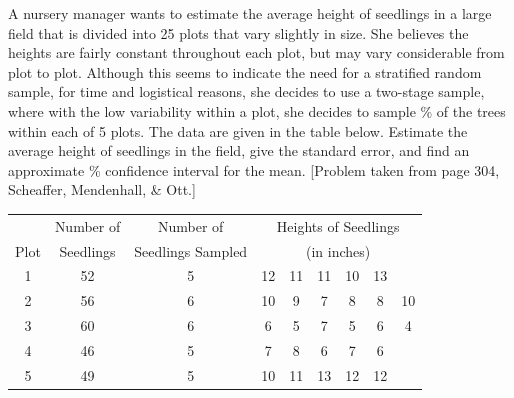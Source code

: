 \documentclass[usenames,dvipsnames]{homework}
\begin{document}
\begin{longproblem}
A nursery manager wants to estimate the average height of seedlings in a large field that is divided into 25 plots that vary slightly in size.  She believes the heights are fairly constant throughout each plot, but may vary considerable from plot to plot.  Although this seems to indicate the need for a stratified random sample, for time and logistical reasons, she decides to use a two-stage sample, where with the low variability within a plot, she decides to sample \unit[10]{\%} of the trees within each of 5 plots.  The data are given in the table below.  Estimate the average height of seedlings in the field, give the standard error, and find an approximate \unit[95]{\%} confidence interval for the mean.  [Problem taken from page 304, Scheaffer, Mendenhall, \& Ott.]

  \begin{center}
  \renewcommand{\arraystretch}{1.3}
  \begin{tabular}{c c c c c c c c c}
  \hline
       & Number of & Number of		& \multicolumn{6}{c}{Heights of Seedlings} \\ 
  Plot & Seedlings & Seedlings Sampled  & \multicolumn{6}{c}{(in inches)}          \\ \hline
  1    & 52        & 5                  & 12 & 11 & 11 & 10 & 13 &    \\
  2    & 56        & 6                  & 10 &  9 &  7 &  8 &  8 & 10 \\
  3    & 60        & 6                  &  6 &  5 &  7 &  5 &  6 &  4 \\
  4    & 46        & 5                  &  7 &  8 &  6 &  7 &  6 &    \\
  5    & 49        & 5                  & 10 & 11 & 13 & 12 & 12 &    \\\hline
  \end{tabular}
  \end{center}
\end{longproblem}
\end{document}
